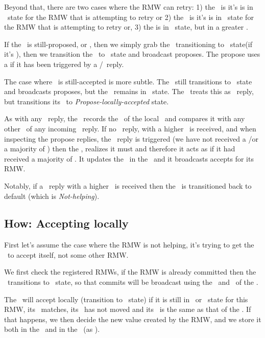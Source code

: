 Beyond that, there are two cases where the RMW can retry:
1) the \kv~is  \ie it's is in \proped~state for the RMW that is attempting to retry or 2) the \kv~is  \ie it's is in \acced~state for the RMW that is attempting to retry or, 3) the \kv is in \invalid~state, but in a greater \logno.

If the \kv~is still-proposed, or \invalid, then we simply grab the \kv~transitioning to \proped~state(if it's \invalid), then we transition the \locentry~to \proped~state and broadcast proposes. The propose uses a  if it has been triggered by a \highprop/\highacc~reply.


\custvspace{}
The case where \kv~is still-accepted is more subtle. The \locentry~still transitions to \proped~state and broadcasts proposes, but the \kv~remains in \acced~state. 
The \locentry~treats this as \lowacc~reply, but transitions its \helpflag~to \emph{Propose-locally-accepted} state. 

As with any \lowacc~reply, the \locentry~records the \accts~of the local \kv~and compares it with any other \accts~of any incoming \lowacc~reply.
If no \lowacc~reply, with a higher \accts~is received, and when inspecting the propose replies, the \lowacc~reply is triggered (\ie we have not received a \alreadycom/\loglow or a majority of \acks) then the \locentry, realizes it must  and therefore it acts as if it had received a majority of \acks. It updates the \accts~in the \kv~and it broadcasts accepts for its RMW.

Notably, if a \lowacc~reply with a higher \accts~is received then the \helpflag~is transitioned back to default (which is \emph{Not-helping}).


\subsection{How: Accepting locally} \label{sec:how:accept}

First let's assume the case where the RMW is not helping, \ie it's trying to get the \kv~to accept itself, not some other RMW.

\custvspace
{}
We first check the registered RMWs, if the RMW is already committed then the \locentry~transitions to \bcast~state, so that commits will be broadcast using the \accval~and \acclogno~of the \locentry.

The \kv~will accept locally (\ie transition to \acced~state) if it is still in \acced~or \proped~state for this RMW, \ie its \rmw~matches, its \logno~has not moved and its \propts~is the same as that of the \locentry. If that happens, we then decide the new value created by the RMW, and we store it both in the \locentry~and in the \kv~(as \accval).

